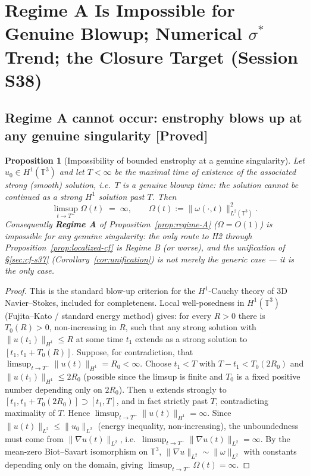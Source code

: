 \documentclass[11pt]{article}
\newtheorem{proposition}[theorem]{Proposition}
\theoremstyle{definition}
\theoremstyle{remark}
\newcommand{\T}{\mathbb{T}}
\begin{document}
\section{Regime A Is Impossible for Genuine Blowup; Numerical $\sigma^*$ Trend; the Closure Target (Session S38)}
\label{sec:closure-s38}

\subsection{Regime A cannot occur: enstrophy blows up at any genuine singularity [Proved]}

\begin{proposition}[Impossibility of bounded enstrophy at a genuine singularity]
  \label{prop:regime-A-impossible}
  Let $u_0\in H^1(\T^3)$ and let $T<\infty$ be the maximal time of existence
  of the associated strong (smooth) solution, i.e.\ $T$ is a genuine
  blowup time: the solution cannot be continued as a strong $H^1$ solution
  past $T$. Then
  \[
    \limsup_{t\to T^-} \Omega(t) \;=\; \infty, \qquad
    \Omega(t) := \|\omega(\cdot,t)\|_{L^2(\T^3)}^2.
  \]
  Consequently \textbf{Regime A} of Proposition~\ref{prop:regime-A}
  ($\Omega=O(1)$) is impossible for any genuine singularity: the only
  route to H2 through Proposition~\ref{prop:localized-cf} is Regime B (or
  worse), and the unification of \S\ref{sec:cf-s37} (Corollary~\ref{cor:unification})
  is not merely the generic case --- it is the \emph{only} case.
\end{proposition}
\begin{proof}
  This is the standard blow-up criterion for the $H^1$-Cauchy theory of 3D
  Navier--Stokes, included for completeness. Local well-posedness in
  $H^1(\T^3)$ (Fujita--Kato / standard energy method) gives: for every
  $R>0$ there is $T_0(R)>0$, non-increasing in $R$, such that any strong
  solution with $\|u(t_1)\|_{H^1}\leq R$ at some time $t_1$ extends as a
  strong solution to $[t_1,t_1+T_0(R)]$. Suppose, for contradiction, that
  $\limsup_{t\to T^-}\|u(t)\|_{H^1} = R_0 <\infty$. Choose $t_1<T$ with
  $T-t_1 < T_0(2R_0)$ and $\|u(t_1)\|_{H^1}\leq 2R_0$ (possible since the
  limsup is finite and $T_0$ is a fixed positive number depending only on
  $2R_0$). Then $u$ extends strongly to $[t_1, t_1+T_0(2R_0)] \supset
  [t_1,T]$, and in fact strictly past $T$, contradicting maximality of
  $T$. Hence $\limsup_{t\to T^-}\|u(t)\|_{H^1}=\infty$. Since
  $\|u(t)\|_{L^2}\leq\|u_0\|_{L^2}$ (energy inequality, non-increasing),
  the unboundedness must come from $\|\nabla u(t)\|_{L^2}$, i.e.\
  $\limsup_{t\to T^-}\|\nabla u(t)\|_{L^2}=\infty$. By the mean-zero
  Biot--Savart isomorphism on $\T^3$, $\|\nabla u\|_{L^2}\sim\|\omega\|_{L^2}$
  with constants depending only on the domain, giving
  $\limsup_{t\to T^-}\Omega(t)=\infty$.
\end{proof}
\end{document}
